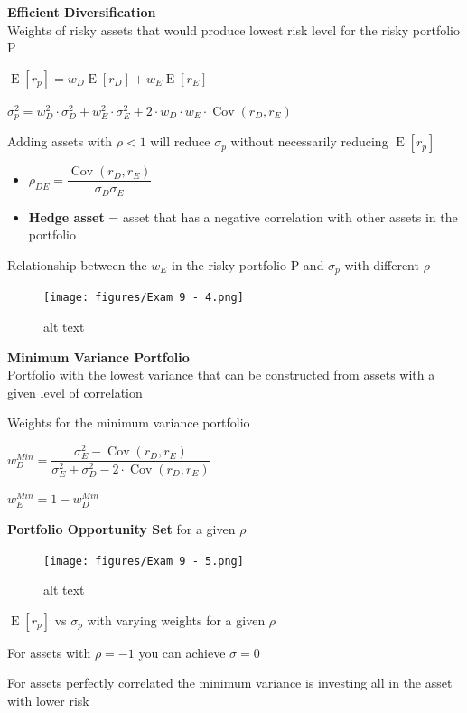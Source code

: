 \documentclass[]{book}
\theoremstyle{definition}
\theoremstyle{definition}
\theoremstyle{remark}
\begin{document}
\textbf{Efficient Diversification}\\
Weights of risky assets that would produce lowest risk level for the
risky portfolio P

\(\operatorname{E}[r_p] = w_D \operatorname{E}[r_D] + w_E \operatorname{E}[r_E]\)

\(\sigma^2_p = w^2_D \cdot \sigma^2_D + w^2_E \cdot \sigma^2_E + 2 \cdot w_D \cdot w_E \cdot \operatorname{Cov}(r_D, r_E)\)

Adding assets with \(\rho < 1\) will reduce \(\sigma_p\) without
necessarily reducing \(\operatorname{E}[r_p]\)

\begin{itemize}
\item
  \(\rho_{DE} = \dfrac{\operatorname{Cov}(r_D, r_E)}{\sigma_D \sigma_E}\)
\item
  \textbf{Hedge asset} = asset that has a negative correlation with
  other assets in the portfolio
\end{itemize}

Relationship between the \(w_E\) in the risky portfolio P and
\(\sigma_p\) with different \(\rho\)

\begin{figure}[htbp]
\centering
\texttt{[image: figures/Exam 9 - 4.png]}
\caption{alt text}
\end{figure}

\textbf{Minimum Variance Portfolio}\\
Portfolio with the lowest variance that can be constructed from assets
with a given level of correlation

Weights for the minimum variance portfolio

\(w_D^{Min} = \dfrac{\sigma^2_E - \operatorname{Cov}(r_D, r_E)}{\sigma^2_E + \sigma^2_D - 2\cdot\operatorname{Cov}(r_D, r_E)}\)

\(w_E^{Min} = 1 - w_D^{Min}\)

 \textbf{Portfolio Opportunity Set} for a given \(\rho\)

\begin{figure}[htbp]
\centering
\texttt{[image: figures/Exam 9 - 5.png]}
\caption{alt text}
\end{figure}

\(\operatorname{E}[r_p]\) vs \(\sigma_p\) with varying weights for a
given \(\rho\)

For assets with \(\rho = -1\) you can achieve \(\sigma = 0\)

For assets perfectly correlated the minimum variance is investing all in
the asset with lower risk
\end{document}
